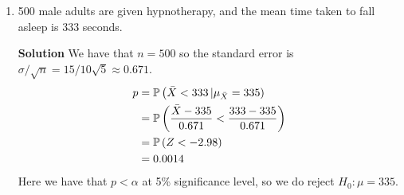 \begin{enumerate}
\begin{enumerate}
        \item 500 male adults are given hypnotherapy, and the mean time taken to fall asleep is 333 seconds.
        \begin{framed}{\textbf{Solution}}
        We have that $n=500$ so the standard error is $\sigma/\sqrt{n} = 15/10\sqrt{5} \approx 0.671$. 
        \begin{align}
            p &= \operatorname{\mathbb{P}}{\left( \bar{X}<333 \left| \mu_{\bar{X}} = 335 \right) \right. } \\
            &= \operatorname{\mathbb{P}}{\left( \frac{\bar{X} - 335}{0.671} < \frac{333-335}{0.671}\right)} \\
            &= \operatorname{\mathbb{P}}{\left( Z< -2.98\right)} \\
            &= 0.0014
        \end{align}
        Here we have that $p<\alpha$ at 5\% significance level, so we do reject $H_0: \mu = 335$.
        \end{framed}
        

\end{enumerate}
\end{enumerate}
